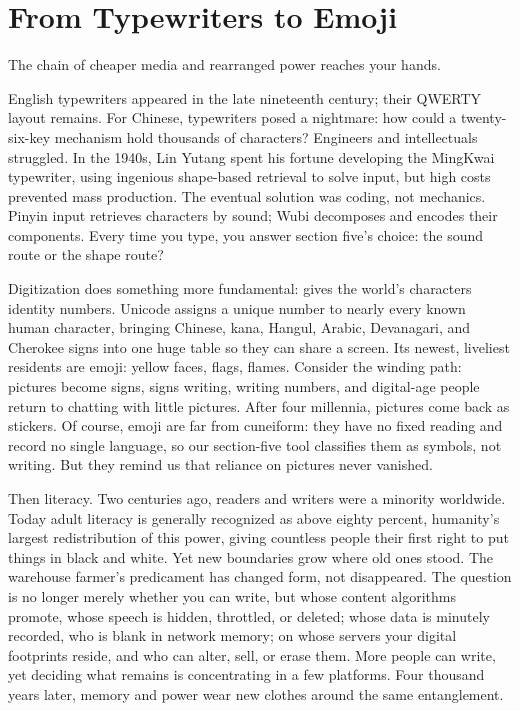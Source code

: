 \section{From Typewriters to Emoji}
The chain of cheaper media and rearranged power reaches your hands.

English typewriters appeared in the late nineteenth century; their QWERTY layout remains. For Chinese, typewriters posed a nightmare: how could a twenty-six-key mechanism hold thousands of characters? Engineers and intellectuals struggled. In the 1940s, Lin Yutang spent his fortune developing the MingKwai typewriter, using ingenious shape-based retrieval to solve input, but high costs prevented mass production. The eventual solution was coding, not mechanics. Pinyin input retrieves characters by sound; Wubi decomposes and encodes their components. Every time you type, you answer section five's choice: the sound route or the shape route?

Digitization does something more fundamental: gives the world's characters identity numbers. Unicode assigns a unique number to nearly every known human character, bringing Chinese, kana, Hangul, Arabic, Devanagari, and Cherokee signs into one huge table so they can share a screen. Its newest, liveliest residents are emoji: yellow faces, flags, flames. Consider the winding path: pictures become signs, signs writing, writing numbers, and digital-age people return to chatting with little pictures. After four millennia, pictures come back as stickers. Of course, emoji are far from cuneiform: they have no fixed reading and record no single language, so our section-five tool classifies them as symbols, not writing. But they remind us that reliance on pictures never vanished.

Then literacy. Two centuries ago, readers and writers were a minority worldwide. Today adult literacy is generally recognized as above eighty percent, humanity's largest redistribution of this power, giving countless people their first right to put things in black and white. Yet new boundaries grow where old ones stood. The warehouse farmer's predicament has changed form, not disappeared. The question is no longer merely whether you can write, but whose content algorithms promote, whose speech is hidden, throttled, or deleted; whose data is minutely recorded, who is blank in network memory; on whose servers your digital footprints reside, and who can alter, sell, or erase them. More people can write, yet deciding what remains is concentrating in a few platforms. Four thousand years later, memory and power wear new clothes around the same entanglement.

